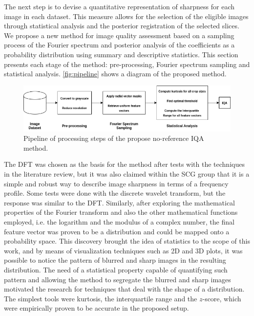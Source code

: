 The next step is to devise a quantitative representation of sharpness for each image in each dataset. This measure allows for the selection of the eligible images through statistical analysis and the posterior registration of the selected slices. We propose a new method for image quality assessment based on a sampling process of the Fourier spectrum and posterior analysis of the coefficients as a probability distribution using summary and descriptive statistics. This section presents each stage of the method: pre-processing, Fourier spectrum sampling and statistical analysis. \autoref{fig:pipeline} shows a diagram of the proposed method.

\begin{figure}[ht]
  \centering
  \includegraphics[scale=0.6]{images/nr-iqa_pipeline.png}
  \caption{Pipeline of processing steps of the propose no-reference IQA method.}
  \label{fig:pipeline}
\end{figure}

The DFT was chosen as the basis for the method after tests with the techniques in the literature review, but it was also claimed within the SCG group that it is a simple and robust way to describe image sharpness in terms of a frequency profile. Some tests were done with the discrete wavelet transform, but the response was similar to the DFT. Similarly, after exploring the mathematical properties of the Fourier transform and also the other mathematical functions employed, i.e. the logarithm and the modulus of a complex number, the final feature vector was proven to be a distribution and could be mapped onto a probability space. This discovery brought the idea of statistics to the scope of this work, and by means of visualization techniques such as 2D and 3D plots, it was possible to notice the pattern of blurred and sharp images in the resulting distribution. The need of a statistical property capable of quantifying such pattern and allowing the method to segregate the blurred and sharp images motivated the research for techniques that deal with the shape of a distribution. The simplest tools were kurtosis, the interquartile range and the $z$-score, which were empirically proven to be accurate in the proposed setup.

